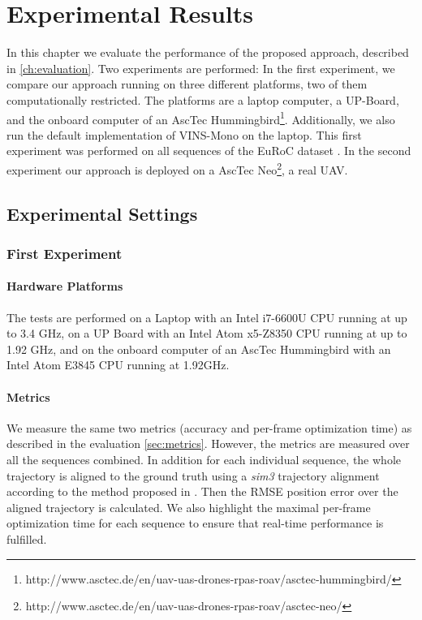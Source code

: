 \chapter{Experimental Results} 
\label{ch:results}

In this chapter we evaluate the performance of the proposed approach, described 
in \autoref{ch:evaluation}. Two experiments are performed: In the first 
experiment, we compare our approach running on three different platforms,
two of them computationally restricted. The platforms are a laptop 
computer, a UP-Board, and the onboard computer of an AscTec 
Hummingbird\footnote{
http://www.asctec.de/en/uav-uas-drones-rpas-roav/asctec-hummingbird/}.
Additionally, we also run the default implementation of VINS-Mono on the 
laptop. This first experiment was performed on all sequences of the EuRoC 
dataset \citep{Burri2016EuRoC}. In the second experiment our approach is 
deployed on a AscTec Neo\footnote{
http://www.asctec.de/en/uav-uas-drones-rpas-roav/asctec-neo/}, a real \ac{UAV}.

\section{Experimental Settings} \label{sec:results_dataset}

\subsection{First Experiment}\label{subsec:firstexperiment}

\subsubsection{Hardware Platforms} \label{subsubsec:hardwareplatforms1}
The tests are performed on a Laptop with an Intel i7-6600U CPU running at up to 
3.4 GHz, on a UP Board with an Intel Atom x5-Z8350 CPU running at up to 1.92 
GHz, and on the onboard computer of an AscTec Hummingbird with an Intel Atom 
E3845 CPU running at 1.92GHz.

\subsubsection{Metrics}\label{subsubsec:metrics}
We measure the same two metrics (accuracy and per-frame optimization time) 
as described in the evaluation \autoref{sec:metrics}. However, the metrics 
are measured over all the sequences combined. In addition for each individual 
sequence, the whole trajectory is aligned to the ground truth using a 
\textit{sim3} trajectory alignment according to the method proposed in 
\citep{Umeyama1991}. Then the RMSE position error over the aligned trajectory is 
calculated. We also highlight the maximal per-frame optimization time for each 
sequence to ensure that real-time performance is fulfilled.

